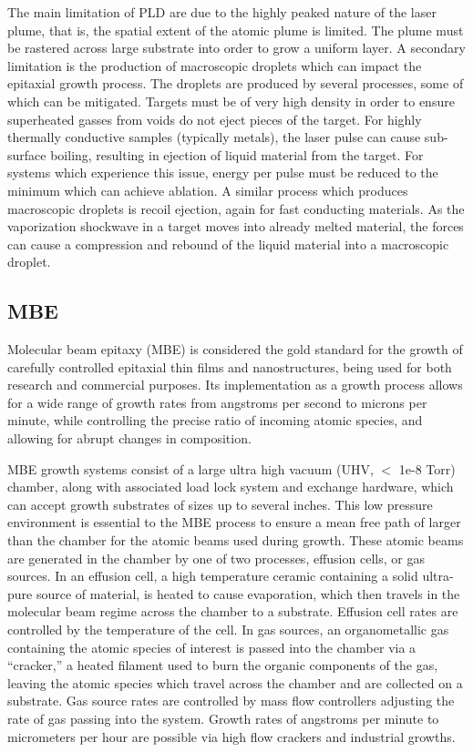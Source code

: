 The main limitation of PLD are due to the highly peaked nature of the laser plume, that is, the spatial extent of the atomic plume is limited.
The plume must be rastered across large substrate into order to grow a uniform layer.
A secondary limitation is the production of macroscopic droplets which can impact the epitaxial growth process.
The droplets are produced by several processes, some of which can be mitigated.
Targets must be of very high density in order to ensure superheated gasses from voids do not eject pieces of the target.
For highly thermally conductive samples (typically metals), the laser pulse can cause sub-surface boiling, resulting in ejection of liquid material from the target.
For systems which experience this issue, energy per pulse must be reduced to the minimum which can achieve ablation.
A similar process which produces macroscopic droplets is recoil ejection, again for fast conducting materials.
As the vaporization shockwave in a target moves into already melted material, the forces can cause a compression and rebound of the liquid material into a macroscopic droplet.

\subsection{MBE} Molecular beam epitaxy (MBE) is considered the gold standard for the growth of carefully controlled epitaxial thin films and nanostructures, being used for both research and commercial purposes.
Its implementation as a growth process allows for a wide range of growth rates from angstroms per second to microns per minute, while controlling the precise ratio of incoming atomic species, and allowing for abrupt changes in composition.

MBE growth systems consist of a large ultra high vacuum (UHV, \(<\) 1e-8 Torr) chamber, along with associated load lock system and exchange hardware, which can accept growth substrates of sizes up to several inches.
This low pressure environment is essential to the MBE process to ensure a mean free path of larger than the chamber for the atomic beams used during growth.
These atomic beams are generated in the chamber by one of two processes, effusion cells, or gas sources.
In an effusion cell, a high temperature ceramic containing a solid ultra-pure source of material, is heated to cause evaporation, which then travels in the molecular beam regime across the chamber to a substrate.
Effusion cell rates are controlled by the temperature of the cell.
In gas sources, an organometallic gas containing the atomic species of interest is passed into the chamber via a ``cracker,'' a heated filament used to burn the organic components of the gas, leaving the atomic species which travel across the chamber and are collected on a substrate.
Gas source rates are controlled by mass flow controllers adjusting the rate of gas passing into the system.
Growth rates of angstroms per minute to micrometers per hour are possible via high flow crackers and industrial growths.

